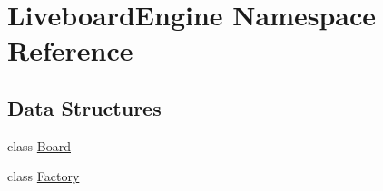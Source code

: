 \hypertarget{namespaceLiveboardEngine}{}\section{Liveboard\+Engine Namespace Reference}
\label{namespaceLiveboardEngine}
\subsection*{Data Structures}
\begin{DoxyCompactItemize}
\item 
class \mbox{\hyperlink{classLiveboardEngine_1_1Board}{Board}}
\item 
class \mbox{\hyperlink{classLiveboardEngine_1_1Factory}{Factory}}
\end{DoxyCompactItemize}

